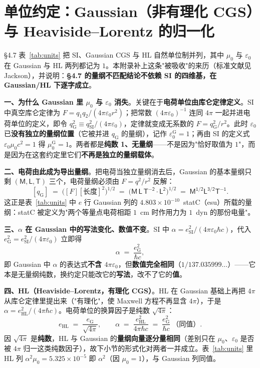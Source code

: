 \documentclass[12pt,a4paper]{article}
\begin{document}
\section{单位约定：Gaussian（非有理化 CGS）与 Heaviside--Lorentz 的归一化}

\S4.7 表~\ref{tab:units} 把 SI、Gaussian CGS 与 HL 自然单位制并列，其中 $\mu_0$ 与 $\varepsilon_0$ 在 Gaussian 与 HL 两列都记为 $1$。本附录补上这条"被吸收"的来历（标准文献见 Jackson\cite{jackson1999}），并说明：\textbf{\S4.7 的量纲不匹配结论不依赖 SI 的四维基，在 Gaussian/HL 下逐字成立}。

\textbf{一、为什么 Gaussian 里 $\mu_0$ 与 $\varepsilon_0$ 消失}。关键在于\textbf{电荷单位由库仑定律定义}。SI 中真空库仑定律为 $F = q_1q_2/(4\pi\varepsilon_0 r^2)$；把常数 $(4\pi\varepsilon_0)^{-1}$ 连同 $4\pi$ 一起并进电荷单位的定义，即令 $q_{\mathrm{G}}^2 \equiv q_{\mathrm{SI}}^2/(4\pi\varepsilon_0)$，定律就变成无系数的 $F = q_{\mathrm{G}}^2/r^2$。此时 $\varepsilon_0$ 已\textbf{没有独立的量纲位置}（它被并进 $q_{\mathrm{G}}$ 的量纲），记作 $\varepsilon_0^{\mathrm{G}} = 1$；再由 SI 的定义式 $\varepsilon_0\mu_0c^2 = 1$ 得 $\mu_0^{\mathrm{G}} = 1$。两者都是\textbf{纯数 1、无量纲}——不是因为"恰好取值为 $1$"，而是因为在这套约定里它们\textbf{不再是独立的量纲载体}。

\textbf{二、电荷由此成为导出量纲}。把电荷当独立量纲消去后，Gaussian 的基本量纲只剩 $(\mathsf{M},\mathsf{L},\mathsf{T})$ 三个，电荷量纲必须由 $F = q^2/r^2$ 反解：
\[
  [q_{\mathrm{G}}] \;=\; \bigl([F][\text{长度}]^2\bigr)^{1/2}
  \;=\; \bigl(\mathsf{M\,L\,T^{-2}}\cdot\mathsf{L^2}\bigr)^{1/2}
  \;=\; \mathsf{M^{1/2}L^{3/2}T^{-1}} .
\]
这正是表~\ref{tab:units} 中 $e$ 行 Gaussian 列的 $4.803\times10^{-10}$~statC（esu）所载的量纲：statC 被定义为"两个等量点电荷相距 $1$~cm 时作用力为 $1$~dyn 的那份电量"。

\textbf{三、$\alpha$ 在 Gaussian 中的写法变化、数值不变}。SI 中 $\alpha = e_{\mathrm{SI}}^2/(4\pi\varepsilon_0\hbar c)$，代入 $e_{\mathrm{G}}^2 = e_{\mathrm{SI}}^2/(4\pi\varepsilon_0)$ 立即得
\[
  \alpha \;=\; \frac{e_{\mathrm{G}}^2}{\hbar c},
\]
即 Gaussian 中 $\alpha$ 的表达式\textbf{不含 $4\pi\varepsilon_0$}，但\textbf{数值完全相同}（$1/137.035999\ldots$）——它本是无量纲纯数，换约定只能改它的\textbf{写法}，改不了它的\textbf{值}。

\textbf{四、HL（Heaviside--Lorentz，有理化 CGS）}。HL 在 Gaussian 基础上再把 $4\pi$ 从库仑定律里提出来（"有理化"，使 Maxwell 方程不再显含 $4\pi$），于是 $\alpha = e_{\mathrm{HL}}^2/(4\pi\hbar c)$。电荷单位的换算因子是纯数 $\sqrt{4\pi}$：
\[
  e_{\mathrm{HL}} \;=\; \frac{e_{\mathrm{G}}}{\sqrt{4\pi}},
  \qquad
  \alpha \;=\; \frac{e_{\mathrm{HL}}^2}{4\pi\hbar c} \;=\; \frac{e_{\mathrm{G}}^2}{\hbar c}\ \text{（同值）}.
\]
因 $\sqrt{4\pi}$ 是\textbf{纯数}，HL 与 Gaussian 的\textbf{量纲向量逐分量相同}（差别只在 $\mu_0$、$\varepsilon_0$ 是否被 $4\pi$ 归一这类纯数因子），故下小节的形式化对两者一并成立。表~\ref{tab:units} 里 HL 列 $\alpha^2\mu_0 = 5.325\times10^{-5}$ 即 $\alpha^2$（因 $\mu_0 = 1$），与 Gaussian 列同值。
\end{document}
